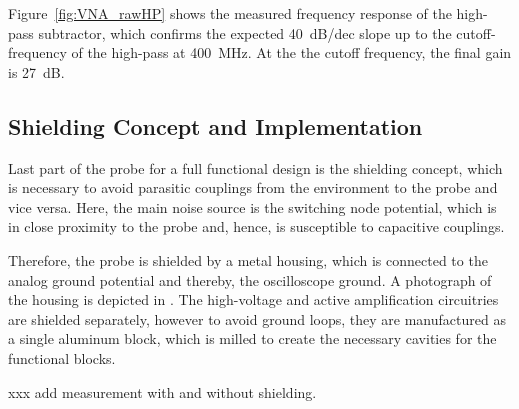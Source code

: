 Figure~\ref{fig:VNA_rawHP} shows the measured frequency response of the high-pass subtractor, which confirms the expected \SI{+40}{dB/dec} slope up to the cutoff-frequency of the high-pass at \SI{400}{MHz}.
At the the cutoff frequency, the final gain is \SI{27}{dB}.

\subsection{Shielding Concept and Implementation}

Last part of the probe for a full functional design is the shielding concept, which is necessary to avoid parasitic couplings from the environment to the probe and vice versa.
Here, the main noise source is the switching node potential, which is in close proximity to the probe and, hence, is susceptible to capacitive couplings.

Therefore, the probe is shielded by a metal housing, which is connected to the analog ground potential and thereby, the oscilloscope ground.
A photograph of the housing is depicted in .
The high-voltage and active amplification circuitries are shielded separately, however to avoid ground loops, they are manufactured as a single aluminum block, which is milled to create the necessary cavities for the functional blocks.


xxx add measurement with and without shielding.

